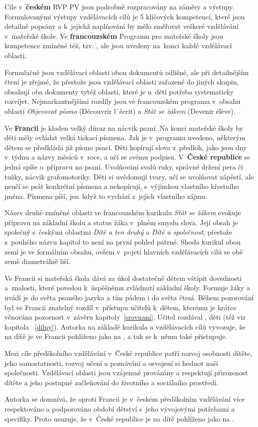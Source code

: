 	Cíle v~\textbf{českém} RVP PV jsou podrobně rozpracovány na záměry a výstupy. Formulovanými výstupy vzdělávacích cílů je 5 klíčových kompetencí, které jsou detailně popsány a k jejichž naplňování by mělo směřovat veškeré vzdělávání v~mateřské škole. Ve \textbf{francouzském} Programu pro mateřské školy jsou kompetence zmíněné též, tzv. , ale jsou uvedeny na konci každé vzdělávací oblasti.

	Formulačně jsou vzdělávací oblasti obou dokumentů odlišné, ale při detailnějším čtení je zřejmé, že přestože jsou vzdělávací oblasti zařazené do jiných skupin, obsahují oba dokumenty tytéž oblasti, které je u~dětí potřeba systematicky rozvíjet. Nejmarkantnějšími rozdíly jsou ve francouzském programu v~obsahu oblastí \textit{Objevovat písmo} (Découvrir l´écrit) a \textit{Stát se žákem} (Devenir élève).

	Ve \textbf{Francii} je kladen velký důraz na nácvik psaní. Na konci mateřské školy by děti měly ovládat velká tiskací písmena. Jak je v programu uvedeno, některým dětem se předkládá již písmo psací. Děti kopírují slova z~předloh, jako jsou dny v týdnu a názvy měsíců v roce, a učí se svému podpisu. V \textbf{České republice} se jedná spíše o~přípravu na psaní. Uvolňování svalů ruky, správné držení pera či tužky, nácvik grafomotoriky. Děti si uvědomují tvary, učí se uvolňovat zápěstí, ale neučí se psát konkrétní písmena a nekopírují, s~výjimkou vlastního křestního jména. Písmena píší, jen když to vychází z jejich vlastního zájmu. 

	Název druhé zmíněné oblasti ve francouzském kurikulu \textit{Stát se žákem} evokuje přípravu na základní školu a status žáka v~plném smyslu slova. Její obsah je společný s českými oblastmi \textit{Dítě a ten druhý} a \textit{Dítě a společnost}, přestože z~pouhého názvu kapitol to není na první pohled patrné. Shoda kurikul obou zemí je ve formálním obsahu, ovšem v~pojetí hlavních vzdělávacích cílů se obě země diametrálně liší.

	Ve Francii si mateřská škola dává za úkol dostatečně dětem vštípit dovednosti a znalosti, které povedou k~úspěšnému zvládnutí základní školy. Formuje žáky a uvádí je do světa psaného jazyka a tím pádem i do světa čtení. Během pozorování byl ve Francii znatelný rozdíl v~přístupu učitelů k~dětem, kterému je krátce věnována pozornost v~závěru kapitoly~\ref{srovnani}. Učitel rozdával , děti  (též viz kapitola ~\ref{dilny}). Autorka na základě kurikula a vzdělávacích cílů vyvozuje, že na dítě je ve Francii pohlíženo jako na , a tak se k~němu také přistupuje. 

	Mezi cíle předškolního vzdělávání v~České republice patří rozvoj osobnosti dítěte, jeho samostatnosti, rozvoj učení a poznávání a osvojení si hodnot naší společnosti. Vzdělávací oblasti jsou vzájemně provázány a respektují přirozenost dítěte a jeho postupné začleňování do životního a sociálního prostředí. 

	Autorka se domnívá, že oproti Francii je v~českém předškolním vzdělávání více respektováno a podporováno období dětství s~jeho vývojovými potřebami a specifiky. Proto usuzuje, že v~České republice je na dítě pohlíženo jako na .

